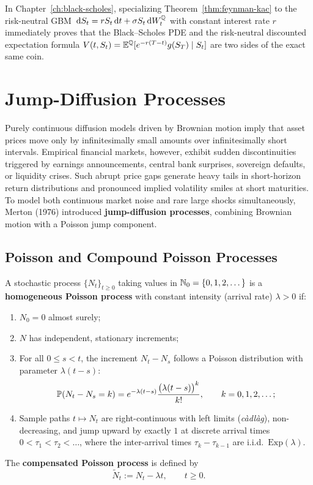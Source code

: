 In Chapter~\ref{ch:black-scholes}, specializing Theorem~\ref{thm:feynman-kac} to the risk-neutral GBM $\,\mathrm{d} S_t = r S_t \,\mathrm{d} t + \sigma S_t \,\mathrm{d} W_t^{\mathbb{Q}}$ with constant interest rate $r$ immediately proves that the Black--Scholes PDE and the risk-neutral discounted expectation formula $V(t, S_t) = \mathbb{E}^{\mathbb{Q}}[e^{-r(T-t)} g(S_T) \mid S_t]$ are two sides of the exact same coin.

\section{Jump-Diffusion Processes}
\label{sec:jump-diffusions}

Purely continuous diffusion models driven by Brownian motion imply that asset prices move only by infinitesimally small amounts over infinitesimally short intervals. Empirical financial markets, however, exhibit sudden discontinuities triggered by earnings announcements, central bank surprises, sovereign defaults, or liquidity crises. Such abrupt price gaps generate heavy tails in short-horizon return distributions and pronounced implied volatility smiles at short maturities. To model both continuous market noise and rare large shocks simultaneously, Merton (1976) introduced \textbf{jump-diffusion processes}, combining Brownian motion with a Poisson jump component.

\subsection{Poisson and Compound Poisson Processes}
\label{subsec:poisson}

\begin{definition}
\label{def:poisson-process}
A stochastic process $\{N_t\}_{t \ge 0}$ taking values in $\mathbb{N}_0 = \{0, 1, 2, \dots\}$ is a \textbf{homogeneous Poisson process} with constant intensity (arrival rate) $\lambda > 0$ if:
\begin{enumerate}
    \item $N_0 = 0$ almost surely;
    \item $N$ has independent, stationary increments;
    \item For all $0 \le s < t$, the increment $N_t - N_s$ follows a Poisson distribution with parameter $\lambda(t - s)$:
    \[
    \mathbb{P}(N_t - N_s = k) = e^{-\lambda(t - s)}\frac{\big(\lambda(t - s)\big)^k}{k!}, \qquad k = 0, 1, 2, \dots;
    \]
    \item Sample paths $t \mapsto N_t$ are right-continuous with left limits (\emph{c\`adl\`ag}), non-decreasing, and jump upward by exactly $1$ at discrete arrival times $0 < \tau_1 < \tau_2 < \dots$, where the inter-arrival times $\tau_k - \tau_{k-1}$ are i.i.d.\ $\mathrm{Exp}(\lambda)$.
\end{enumerate}
The \textbf{compensated Poisson process} is defined by
\[
\widetilde{N}_t := N_t - \lambda t, \qquad t \ge 0.
\]
\end{definition}

